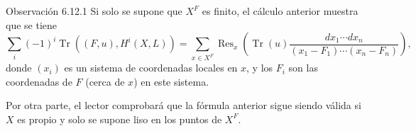 \begin{statement}{Observación 6.12.1}
Si solo se supone que $X^F$ es finito, el cálculo anterior muestra que se tiene
\[
\sum_i(-1)^i\operatorname{Tr}((F,u),H^i(X,L))=
\sum_{x\in X^F}\operatorname{Res}_x\left(\operatorname{Tr}(u)\frac{dx_1\cdots dx_n}{(x_1-F_1)\cdots(x_n-F_n)}\right),
\]
donde $(x_i)$ es un sistema de coordenadas locales en $x$, y los $F_i$ son las coordenadas de $F$ (cerca de $x$) en este sistema.

Por otra parte, el lector comprobará que la fórmula anterior sigue siendo válida si $X$ es propio y solo se supone liso en los puntos de $X^F$.
\end{statement}

